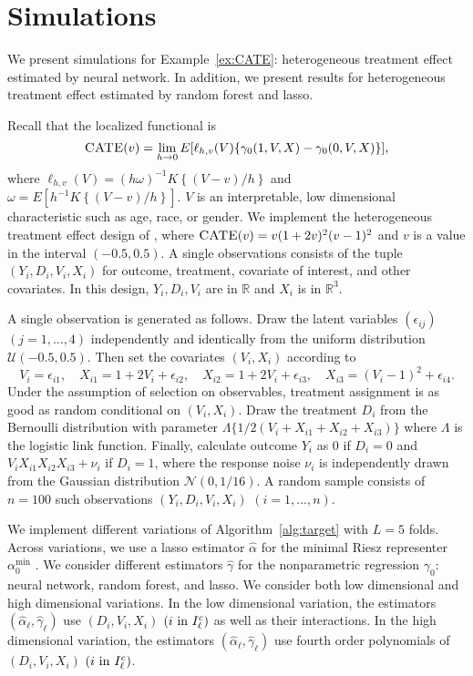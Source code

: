 \section{Simulations}

We present simulations for Example~\ref{ex:CATE}: heterogeneous treatment effect estimated by neural network. In addition, we present results for heterogeneous treatment effect estimated by random forest and lasso.

Recall that the localized functional is 
$$
\textsc{CATE}(v)=\lim_{h\rightarrow 0}E[\ell_{h,v}(V)\{\gamma_0(1,V,X)-\gamma_0(0,V,X)\}],$$ where
$
\ell_{h,v}(V)=(h\omega)^{-1}K\left\{(V-v)/h\right\}$ and $\omega=E [h^{-1} K\left\{(V-v)/h\right\}].
$
$V$ is an interpretable, low dimensional characteristic such as age, race, or gender. We implement the heterogeneous treatment effect design of \cite{abrevaya2015estimating}, 
where $\textsc{CATE}(v)=v(1+2v)^2(v-1)^2$ and $v$ is a value in the interval $(-0.5,0.5)$. A single observations consists of the tuple $(Y_i,D_i,V_i,X_i)$ for outcome, treatment, covariate of interest, and other covariates. In this design, $Y_i,D_i,V_i$ are in $\mathbb{R}$ and $X_i$ is in $\mathbb{R}^3$.

A single observation is generated as follows. Draw the latent variables $(\epsilon_{ij})$ $(j=1,...,4)$ independently and identically from the uniform distribution $ \mathcal{U}(-0.5,0.5)$. Then set the covariates $(V_i,X_i)$ according to
$$
V_i=\epsilon_{i1},\quad X_{i1}=1+2V_i+\epsilon_{i2},\quad X_{i2}=1+2V_i+\epsilon_{i3},\quad X_{i3}=(V_i-1)^2+\epsilon_{i4}.
$$
Under the assumption of selection on observables, treatment assignment is as good as random conditional on $(V_i,X_i)$. Draw the treatment $D_i$ from the Bernoulli distribution with parameter $\Lambda \{1/2(V_i+X_{i1}+X_{i2}+X_{i3})\}$ where $\Lambda$ is the logistic link function. Finally, calculate outcome $Y_i$ as $0$ if $D_i=0$ and $V_i X_{i1} X_{i2} X_{i3}+\nu_i$ if $D_i=1$, where the response noise $\nu_i$ is independently drawn from the Gaussian distribution $\mathcal{N}(0,1/16)$. A random sample consists of $n=100$ such observations $(Y_i,D_i,V_i,X_i)$ $(i=1,...,n)$.

We implement different variations of Algorithm~\ref{alg:target} with $L=5$ folds. Across variations, we use a lasso estimator $\hat{\alpha}$ for the minimal Riesz representer $\alpha_0^{\min}$ \cite{chernozhukov2018learning}. We consider different  estimators $\hat{\gamma}$ for the nonparametric regression $\gamma_0$: neural network, random forest, and lasso. We consider both low dimensional and high dimensional variations. In the low dimensional variation, the estimators $(\hat{\alpha}_{\ell},\hat{\gamma}_{\ell})$ use $(D_i,V_i,X_i)$ $(i \text{ \normalfont in } I^c_{\ell})$ as well as their interactions. In the high dimensional variation, the estimators $(\hat{\alpha}_{\ell},\hat{\gamma}_{\ell})$ use fourth order polynomials of $(D_i,V_i,X_i)$ $(i \text{ \normalfont in } I^c_{\ell})$.

